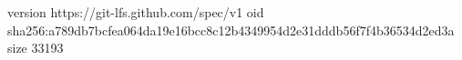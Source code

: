 version https://git-lfs.github.com/spec/v1
oid sha256:a789db7bcfea064da19e16bcc8c12b4349954d2e31dddb56f7f4b36534d2ed3a
size 33193
